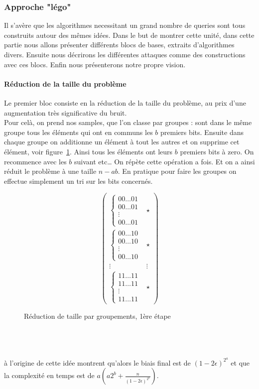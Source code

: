 \documentclass{article}		%
\theoremstyle{definition}
\theoremstyle{plain}
\begin{document}
\subsubsection{Approche "légo"}
Il s'avère que les algorithmes  necessitant un grand nombre
de queries sont tous construits autour des mêmes idées. Dans le but de
montrer cette unité, dans cette partie nous allons présenter différents
blocs de bases, extraits d'algorithmes divers. Ensuite nous décrirons les
différentes attaques comme des constructions avec ces blocs. Enfin nous
présenterons notre propre vision.  

\paragraph{Réduction de la taille du problème}
Le premier bloc consiste en la réduction de la taille du problème, au
prix d'une augmentation très significative du bruit.
\\
Pour celà, on prend nos samples, que l'on classe par groupes : sont dans
le même groupe tous les éléments qui ont en communs les $b$ premiers bits.
Ensuite dans chaque groupe on additionne un élément à tout les autres et
on supprime cet élément, voir figure~\ref{bbkw}. Ainsi tous les éléments ont leurs $b$ premiers
bits à zero. On recommence avec les $b$ suivant etc\dots
On répète cette opération a fois. Et on a ainsi réduit le problème à une
taille $n-ab$. En pratique pour faire les groupes on effectue simplement
un tri sur les bits concernés.
\begin{figure}
$$\begin{pmatrix}
\begin{cases}00\dots01 \\00\dots01\\ \vdots\\00\dots01 \end{cases} & \star \\
\begin{cases} 00\dots10 \\00\dots10\\ \vdots\\00\dots10  \end{cases} & \star  \\
\vdots & \vdots \\
\begin{cases} 11\dots11 \\11\dots11\\ \vdots\\11\dots11  \end{cases} & \star 
\end{pmatrix}$$
\caption{Réduction de taille par groupements, 1ère étape}
\label{bbkw}
\end{figure}
\\
\\
\\
\cite{BKW} à l'origine de cette idée montrent qu'alors le biais final est
de $(1-2\epsilon)^{2^a}$ et que la complexité en temps est de
$a(a2^b+\frac {n} {(1-2\epsilon)^{2^a}})$.
\end{document}
